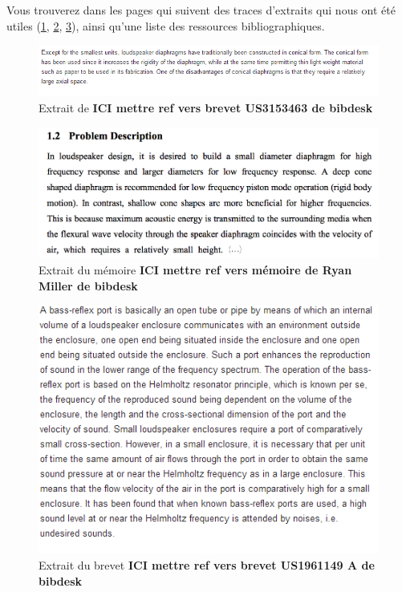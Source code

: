 Vous trouverez dans les pages qui suivent des traces d'extraits qui nous ont été utiles (\ref{Trace 1}, \ref{Trace 2}, \ref{Trace 3}), ainsi qu'une liste des ressources bibliographiques.

\begin{figure}
\begin{center}
\includegraphics[scale=0.8]{img/Trace1-brevet US 3153463.png}
\end{center}
\caption{Extrait de \cite{f1964compound} \textbf{ICI mettre ref vers brevet US3153463 de bibdesk}} 
 \label{Trace 1}
\end{figure}

\begin{figure}
\begin{center}
\includegraphics[scale=0.35]{img/Trace2-Miller.png}
\end{center}
\caption{Extrait du mémoire \textbf{ICI mettre ref vers mémoire de Ryan Miller de bibdesk}} 
 \label{Trace 2}
\end{figure}

\begin{figure}
\begin{center}
\includegraphics{img/Trace 3-US 1961149 A.png}
\end{center}
\caption{Extrait du brevet \textbf{ICI mettre ref vers brevet US1961149 A de bibdesk}} 
 \label{Trace 3}
\end{figure}

